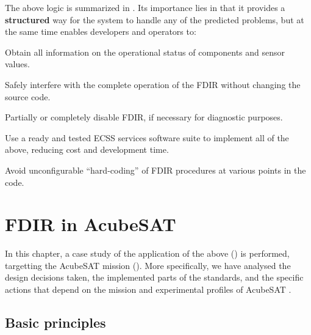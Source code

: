 \documentclass[a4paper,nobib,final]{tufte-book}
\begin{document}
The above logic is summarized in . Its importance lies in that it provides a \textbf{structured} way for the system to handle any of the predicted problems, but at the same time enables developers and operators to:
\begin{compactitem}
	\item Obtain all information on the operational status of components and sensor values.
	\item Safely interfere with the complete operation of the \acs{FDIR} without changing the source code.
	\item Partially or completely disable \acs{FDIR}, if necessary for diagnostic purposes.
	\item Use a ready and tested \acs{ECSS} services software suite to implement all of the above, reducing cost and development time.
	\item Avoid unconfigurable ``hard-coding'' of \acs{FDIR} procedures at various points in the code.
\end{compactitem}

\chapter{\acs{FDIR} in AcubeSAT}
\label{cap:acufdir}

In this chapter, a case study of the application of the above () is performed, targetting the AcubeSAT mission (). More specifically, we have analysed the design decisions taken, the implemented parts of the standards, and the specific actions that depend on the mission and experimental profiles of AcubeSAT \autocite{FMEA}.


\section{Basic principles}
\label{sec:fdirbaspri}
\end{document}
